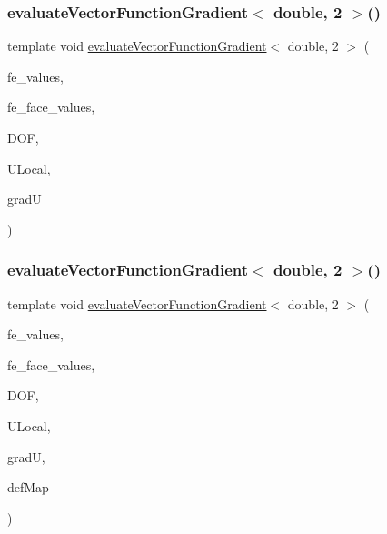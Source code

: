 \mbox{\label{function_evaluations_8cc_a729ea5c9032a46494dbeb1c6e1a678c6}} 
\subsubsection{\texorpdfstring{evaluateVectorFunctionGradient$<$ double, 2 $>$()}{evaluateVectorFunctionGradient< double, 2 >()}\hspace{0.1cm}{\footnotesize\ttfamily [3/4]}}
{\footnotesize\ttfamily template void \mbox{\hyperlink{group___evaluation_functions_ga9608539d601a91aff1ba01ccc720fbe0}{evaluate\+Vector\+Function\+Gradient}}$<$ double, 2 $>$ (\begin{DoxyParamCaption}\item[{const F\+E\+Values$<$ 2 $>$ \&}]{fe\+\_\+values,  }\item[{const F\+E\+Face\+Values$<$ 2 $>$ \&}]{fe\+\_\+face\+\_\+values,  }\item[{unsigned int}]{D\+OF,  }\item[{Table$<$ 1, double $>$ \&}]{U\+Local,  }\item[{Table$<$ 3, double $>$ \&}]{gradU }\end{DoxyParamCaption})}

\mbox{\label{function_evaluations_8cc_a60c8d8f11fc75f1a2d1775dd5ea95d79}} 
\subsubsection{\texorpdfstring{evaluateVectorFunctionGradient$<$ double, 2 $>$()}{evaluateVectorFunctionGradient< double, 2 >()}\hspace{0.1cm}{\footnotesize\ttfamily [4/4]}}
{\footnotesize\ttfamily template void \mbox{\hyperlink{group___evaluation_functions_ga9608539d601a91aff1ba01ccc720fbe0}{evaluate\+Vector\+Function\+Gradient}}$<$ double, 2 $>$ (\begin{DoxyParamCaption}\item[{const F\+E\+Values$<$ 2 $>$ \&}]{fe\+\_\+values,  }\item[{const F\+E\+Face\+Values$<$ 2 $>$ \&}]{fe\+\_\+face\+\_\+values,  }\item[{unsigned int}]{D\+OF,  }\item[{Table$<$ 1, double $>$ \&}]{U\+Local,  }\item[{Table$<$ 3, double $>$ \&}]{gradU,  }\item[{\mbox{\hyperlink{structdeformation_map}{deformation\+Map}}$<$ double, 2 $>$ \&}]{def\+Map }\end{DoxyParamCaption})}

